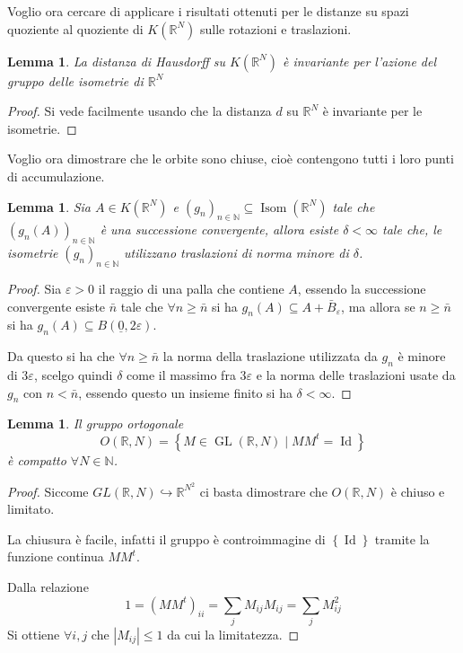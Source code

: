 \documentclass[a4paper,10pt]{article}
\newcounter{counter1}
\theoremstyle{plain}
\newtheorem{mylem}[counter1]{Lemma}
\theoremstyle{definition}
\theoremstyle{remark}
\newcommand{\ubar}[1]{\underline{#1}}
\newcommand{\set}[1]{\left\{#1\right\}}
\newcommand{\pa}[1]{\left(#1\right)}
\newcommand{\abs}[1]{\left|#1\right|}
\DeclareMathOperator{\id}{Id}
\DeclareMathOperator{\gl}{GL}
\DeclareMathOperator{\isom}{Isom}
\begin{document}
Voglio ora cercare di applicare i risultati ottenuti per le distanze
su spazi quoziente al quoziente di $K(\mathbb{R}^N)$ sulle rotazioni e
traslazioni.

\begin{mylem}
  La distanza di Hausdorff su $K(\mathbb{R}^N)$ è invariante per
  l'azione del gruppo delle isometrie di $\mathbb{R}^N$
\end{mylem}
\begin{proof}
  Si vede facilmente usando che la distanza $d$ su $\mathbb{R}^N$ è
  invariante per le isometrie.
\end{proof}

Voglio ora dimostrare che le orbite sono chiuse, cioè contengono tutti
i loro punti di accumulazione.

\begin{mylem}
  \label{lem:traslazionipiccole}
  Sia $A \in K(\mathbb{R}^N)$ e $\pa{ g_n} _{n \in \mathbb{N}}
  \subseteq \isom( \mathbb{R}^N)$ tale che $\pa{ g_n(A) } _{n \in
    \mathbb{N}}$ è una successione convergente, allora esiste $\delta
  < \infty$ tale che, le isometrie $\pa{ g_n} _{n\in \mathbb{N}}$
  utilizzano traslazioni di norma minore di $\delta$.
\end{mylem}
\begin{proof}
  Sia $\varepsilon > 0$ il raggio di una palla che contiene $A$,
  essendo la successione convergente esiste $\bar n$ tale che $\forall
  n \ge \bar n$ si ha $g_n(A) \subseteq A + \bar B _{\varepsilon}$, ma
  allora se $n \ge \bar n$ si ha $g_n(A) \subseteq B(\ubar{0},
  2\varepsilon)$.

  Da questo si ha che $\forall n \ge \bar n$ la norma della
  traslazione utilizzata da $g_n$ è minore di $3 \varepsilon$, scelgo
  quindi $\delta$ come il massimo fra $3\varepsilon$ e la norma delle
  traslazioni usate da $g_n$ con $n< \bar n$, essendo questo un
  insieme finito si ha $\delta < \infty$.
\end{proof}

\begin{mylem}
  Il gruppo ortogonale 
  \[ O(\mathbb{R},N) = \set{ M \in \gl (\mathbb{R},N) \mid M M^t =
    \id } \]
  è compatto $\forall N \in \mathbb{N}$.
\end{mylem}
\begin{proof}
  Siccome $GL(\mathbb{R},N) \hookrightarrow \mathbb{R}^{N^2}$ ci basta
  dimostrare che $O(\mathbb{R},N)$ è chiuso e limitato.
  
  La chiusura è facile, infatti il gruppo è controimmagine di
  $\set{\id}$ tramite la funzione continua $MM^t$.

  Dalla relazione
  \[ 1 = \pa{MM^t}_{ii} = \sum _j M_{ij} M_{ij} = \sum _j M_{ij} ^2 \] 
  Si ottiene $\forall i,j$ che $\abs{M_{ij}} \le 1$ da cui la
  limitatezza.
\end{proof}
\end{document}

